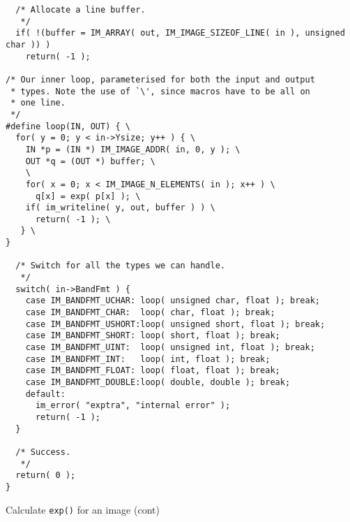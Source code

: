 \begin{fig2}
\begin{verbatim}
  /* Allocate a line buffer.
   */
  if( !(buffer = IM_ARRAY( out, IM_IMAGE_SIZEOF_LINE( in ), unsigned char )) )
    return( -1 );

/* Our inner loop, parameterised for both the input and output
 * types. Note the use of `\', since macros have to be all on
 * one line.
 */
#define loop(IN, OUT) { \
  for( y = 0; y < in->Ysize; y++ ) { \
    IN *p = (IN *) IM_IMAGE_ADDR( in, 0, y ); \
    OUT *q = (OUT *) buffer; \
    \
    for( x = 0; x < IM_IMAGE_N_ELEMENTS( in ); x++ ) \
      q[x] = exp( p[x] ); \
    if( im_writeline( y, out, buffer ) ) \
      return( -1 ); \
   } \
}

  /* Switch for all the types we can handle.
   */
  switch( in->BandFmt ) {
    case IM_BANDFMT_UCHAR: loop( unsigned char, float ); break;
    case IM_BANDFMT_CHAR:  loop( char, float ); break;
    case IM_BANDFMT_USHORT:loop( unsigned short, float ); break;
    case IM_BANDFMT_SHORT: loop( short, float ); break;
    case IM_BANDFMT_UINT:  loop( unsigned int, float ); break;
    case IM_BANDFMT_INT:   loop( int, float ); break;
    case IM_BANDFMT_FLOAT: loop( float, float ); break;
    case IM_BANDFMT_DOUBLE:loop( double, double ); break;
    default:
      im_error( "exptra", "internal error" );
      return( -1 );
  }

  /* Success.
   */
  return( 0 );
}
\end{verbatim}
\caption{Calculate \texttt{exp()} for an image (cont)}
\end{fig2}
